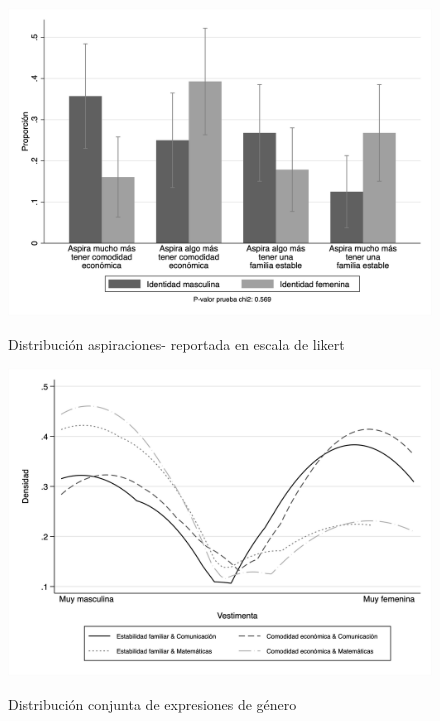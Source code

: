 \begin{figure}[!ht]
	\centering
	\caption{Distribución aspiraciones- reportada en escala de likert}
	\includegraphics[width=13cm]{Images/aspiration_likert.png}
	\label{fig:aspiration_dist}
\end{figure}
\begin{figure}[!ht]
	\centering
	\caption{Distribución conjunta de expresiones de género }
	\includegraphics[width=13cm]{Images/gender_expressions.png}
	\label{fig:jointdistribution}
\end{figure}
\vspace*{6cm}